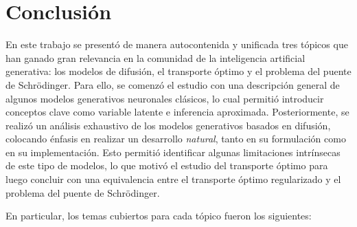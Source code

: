 \chapter*{Conclusión}

En este trabajo se presentó de manera autocontenida y unificada tres tópicos que han ganado gran relevancia en la comunidad de la inteligencia artificial generativa: los modelos de difusión, el transporte óptimo y el problema del puente de Schrödinger. Para ello, se comenzó el estudio con una descripción general de algunos modelos generativos neuronales clásicos, lo cual permitió introducir conceptos clave como variable latente e inferencia aproximada. Posteriormente, se realizó un análisis exhaustivo de los modelos generativos basados en difusión, colocando énfasis en realizar un desarrollo \textit{natural}, tanto en su formulación como en su implementación. Esto permitió identificar algunas limitaciones intrínsecas de este tipo de modelos, lo que motivó el estudio del transporte óptimo para luego concluir con una equivalencia entre el transporte óptimo regularizado y el problema del puente de Schrödinger.

En particular, los temas cubiertos para cada tópico fueron los siguientes:

